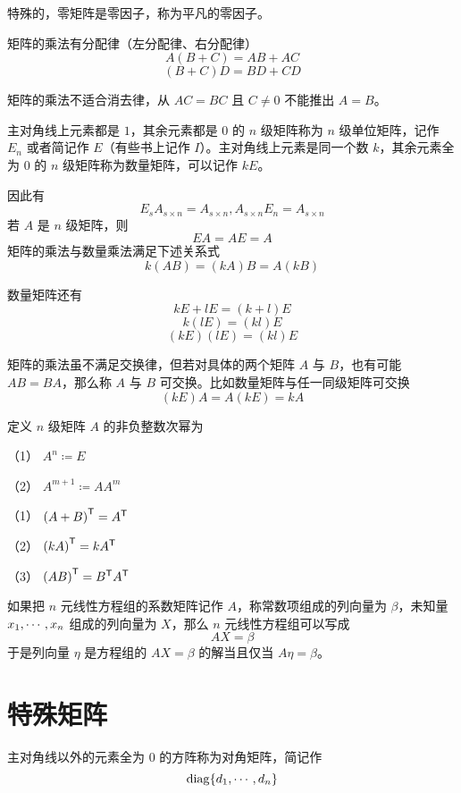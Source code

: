 特殊的，零矩阵是零因子，称为平凡的零因子。

\begin{theorem}
    矩阵的乘法有分配律（左分配律、右分配律）
    \[A(B+C) = AB+AC\]
    \[(B+C)D = BD + CD\]
\end{theorem}

矩阵的乘法不适合消去律，从 $AC = BC$ 且 $C\ne 0$ 不能推出 $A=B$。

主对角线上元素都是 $1$，其余元素都是 $0$ 的 $n$ 级矩阵称为 $n$ 级单位矩阵，记作 $E_n$ 或者简记作 $E$（有些书上记作 $I$）。主对角线上元素是同一个数 $k$，其余元素全为 $0$ 的 $n$ 级矩阵称为数量矩阵，可以记作 $kE$。

因此有
\[E_s A_{s \times n} = A_{s \times n}, A_{s \times n} E_n= A_{s \times n}\]
若 $A$ 是 $n$ 级矩阵，则
\[EA = AE = A\]
矩阵的乘法与数量乘法满足下述关系式
\[k(AB) = (kA)B = A(kB)\]

数量矩阵还有
\[kE + lE = (k+l)E\]
\[k(lE) = (kl)E\]
\[(kE)(lE) = (kl)E\]

矩阵的乘法虽不满足交换律，但若对具体的两个矩阵 $A$ 与 $B$，也有可能 $AB = BA$，那么称 $A$ 与 $B$ 可交换。比如数量矩阵与任一同级矩阵可交换
\[(kE)A = A(kE) = kA\]

\begin{definition}
    定义 $n$ 级矩阵 $A$ 的非负整数次幂为

    （1） $A^n \coloneqq  E$

    （2） $A^{m+1} \coloneqq  AA^m$
\end{definition}


\begin{theorem}
    （1） ${(A+B)}^\mathsf{T} = {A}^\mathsf{T}$
    
    （2） ${(kA)}^\mathsf{T} = k{A}^\mathsf{T}$
    
    （3） ${(AB)}^\mathsf{T} = {B}^\mathsf{T}{A}^\mathsf{T}$
\end{theorem}

如果把 $n$ 元线性方程组的系数矩阵记作 $A$，称常数项组成的列向量为 $\beta$，未知量 $x_1,\cdots,x_n$ 组成的列向量为 $X$，那么 $n$ 元线性方程组可以写成
\[AX = \beta\]
于是列向量 $\eta$ 是方程组的 $AX = \beta$ 的解当且仅当 $A\eta = \beta$。

\section{特殊矩阵}

\begin{definition}
    主对角线以外的元素全为 $0$ 的方阵称为对角矩阵，简记作
    \[\operatorname{diag}\{d_1,\cdots,d_n\}\]
\end{definition}

